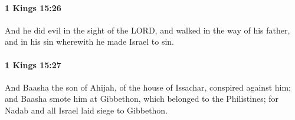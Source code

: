 		\paragraph{1 Kings 15:26} %
			\label{1KINGS-15-26}

			And he did evil in the sight of the LORD, and walked in the way of his father, and in his sin wherewith he made Israel to sin.


		\paragraph{1 Kings 15:27} %
			\label{1KINGS-15-27}

			And Baasha the son of Ahijah, of the house of Issachar, conspired against him; and Baasha smote him at Gibbethon, which belonged to the Philistines; for Nadab and all Israel laid siege to Gibbethon.



